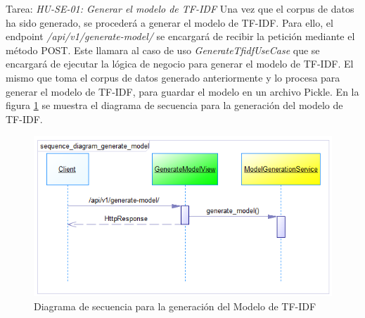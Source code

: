 Tarea: \textit{HU-SE-01: Generar el modelo de TF-IDF}
Una vez que el corpus de datos ha sido generado, se procederá a generar el modelo de TF-IDF.
Para ello, el endpoint \textit{/api/v1/generate-model/} se encargará de recibir la petición mediante el método POST.
Este llamara al caso de uso \textit{GenerateTfidfUseCase} que se encargará de ejecutar la lógica de negocio para generar el modelo de TF-IDF.
El mismo que toma el corpus de datos generado anteriormente y lo procesa para generar el modelo de TF-IDF, para guardar el modelo en un archivo Pickle.
En la figura \ref{fig:sequence-diagram-generate-tfidf} se muestra el diagrama de secuencia para la generación del modelo de TF-IDF.

\begin{figure}[H]
    \centering
    \includegraphics[scale=0.7]{../02Figures/02Chapter/Sprints/Sprint-4/sequence_diagram_generate_model.png}
    \caption{Diagrama de secuencia para la generación del Modelo de TF-IDF}
    \label{fig:sequence-diagram-generate-tfidf}
\end{figure}

